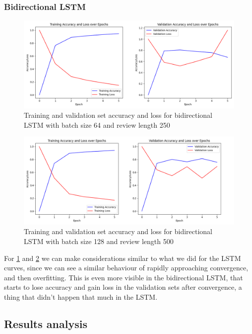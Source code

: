 \documentclass{article}
\begin{document}
\subsubsection{Bidirectional LSTM}

\begin{figure}[H]
  \centering
  \includegraphics[width=0.9\linewidth]{img/training_curves_bidirectional_64_250.png}
  \caption{Training and validation set accuracy and loss for bidirectional LSTM with batch size 64 and review length 250}
  \label{fig:training_curves_bidirectional_64_250}
\end{figure}

\begin{figure}[H]
  \centering
  \includegraphics[width=0.9\linewidth]{img/training_curves_bidirectional_128_500.png}
  \caption{Training and validation set accuracy and loss for bidirectional LSTM with batch size 128 and review length 500}
  \label{fig:training_curves_bidirectional_128_500}
\end{figure}

For \ref{fig:training_curves_bidirectional_64_250} and \ref{fig:training_curves_bidirectional_128_500} we can make considerations similar to what we did for the LSTM curves, since we can see a similar behaviour of rapidly approaching convergence, and then overfitting.
This is even more visible in the bidirectional LSTM, that starts to lose accuracy and gain loss in the validation sets after convergence, a thing that didn't happen that much in the LSTM.

\subsection{Results analysis}
\end{document}
